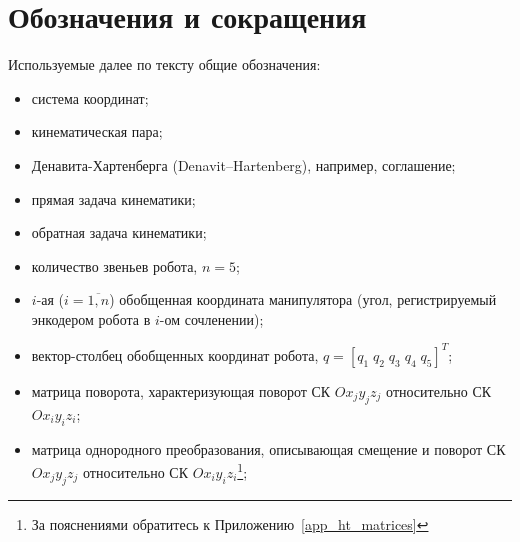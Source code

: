 \section*{Обозначения и сокращения}
Используемые далее по тексту общие обозначения:
\newcommand*{\ditem}[1]{\item[#1~---]}
\begin{itemize}
\ditem{СК} система координат;
\ditem{КП} кинематическая пара;
\ditem{ДХ} Денавита-Хартенберга (Denavit–Hartenberg), например, соглашение;
\ditem{ПЗК} прямая задача кинематики;
\ditem{ОЗК} обратная задача кинематики;
\ditem{$n$} количество звеньев робота, $n = 5$;
\ditem{$q_i$} $i$-ая ($i=\overline{1,n}$) обобщенная координата манипулятора (угол, регистрируемый энкодером робота в $i$-ом сочленении);
\ditem{$q$} вектор-столбец обобщенных координат робота, $q = \left[ q_1 \; q_2 \; q_3 \; q_4 \; q_5 \right]^T$;
\ditem{${}^iR_j$} матрица поворота, характеризующая поворот СК $Ox_{j}y_{j}z_{j}$ относительно СК $Ox_{i}y_{i}z_{i}$;
\ditem{${}^iA_j$} матрица однородного преобразования, описывающая смещение и поворот СК $Ox_{j}y_{j}z_{j}$ относительно СК $Ox_{i}y_{i}z_{i}$\footnote{За пояснениями обратитесь к Приложению~\ref{app_ht_matrices}};






\end{itemize}
